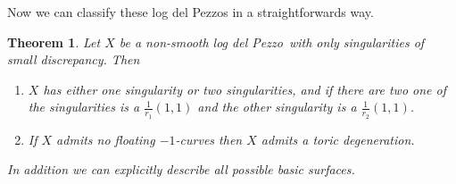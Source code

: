 \documentclass[12pt,a4paper]{book}      %
\newtheorem{thm}{Theorem}[section]
\theoremstyle{definition}
\newcommand{\ldp}{log del Pezzo}
\begin{document}
Now we can classify these log del Pezzos in a straightforwards way. 
\begin{thm}\label{ThmOnSing}
Let $X$ be a non-smooth \ldp\ with only singularities of small discrepancy. Then 
\begin{enumerate}
\item\label{thm38i}
$X$ has either one singularity or two singularities, and if there are two one of the singularities is a $\frac{1}{r_1}(1,1)$ and the other singularity is a $\frac{1}{r_2}(1,1)$.
\item\label{thm38ii}
If $X$ admits no floating $-1$-curves then $X$ admits a toric degeneration. %
\end{enumerate}
In addition we can explicitly describe all possible basic surfaces.
\end{thm}
\end{document}
